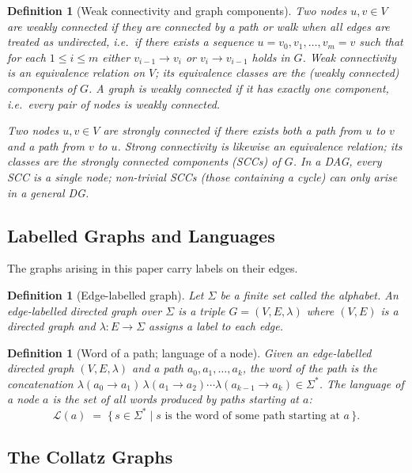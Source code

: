 \documentclass[11pt,a4paper]{article}
\newtheorem{definition}[theorem]{Definition}
\theoremstyle{remark}
\theoremstyle{plain}
\begin{document}
\begin{definition}[Weak connectivity and graph components]
Two nodes $u, v \in V$ are \emph{weakly connected} if they are connected by a path
or walk when all edges are treated as undirected, i.e.\ if there exists a sequence
$u = v_0, v_1, \ldots, v_m = v$ such that for each $1 \le i \le m$ either
$v_{i-1} \to v_i$ or $v_i \to v_{i-1}$ holds in $G$.
Weak connectivity is an equivalence relation on $V$; its equivalence classes are the
\emph{(weakly connected) components} of $G$.
A graph is \emph{weakly connected} if it has exactly one component, i.e.\ every pair
of nodes is weakly connected.

Two nodes $u, v \in V$ are \emph{strongly connected} if there exists both a path from
$u$ to $v$ and a path from $v$ to $u$.
Strong connectivity is likewise an equivalence relation; its classes are the
\emph{strongly connected components} (\emph{SCCs}) of $G$.
In a DAG, every SCC is a single node; non-trivial SCCs (those containing a cycle)
can only arise in a general DG.
\end{definition}

\subsection{Labelled Graphs and Languages}

The graphs arising in this paper carry labels on their edges.

\begin{definition}[Edge-labelled graph]
Let $\Sigma$ be a finite set called the \emph{alphabet}.
An \emph{edge-labelled directed graph} over $\Sigma$ is a triple
$G = (V, E, \lambda)$ where $(V,E)$ is a directed graph and
$\lambda : E \to \Sigma$ assigns a label to each edge.
\end{definition}

\begin{definition}[Word of a path; language of a node]
Given an edge-labelled directed graph $(V,E,\lambda)$ and a path
$a_0, a_1, \ldots, a_k$, the \emph{word of the path} is the concatenation
$\lambda(a_0\to a_1)\,\lambda(a_1\to a_2)\cdots\lambda(a_{k-1}\to a_k) \in \Sigma^*$.
The \emph{language} of a node $a$ is the set of all words produced by paths
starting at $a$:
\[
  \mathcal{L}(a) \;=\;
  \bigl\{\, s \in \Sigma^* \;\big|\; s \text{ is the word of some path starting at } a \,\bigr\}.
\]
\end{definition}

\subsection{The Collatz Graphs}
\end{document}

